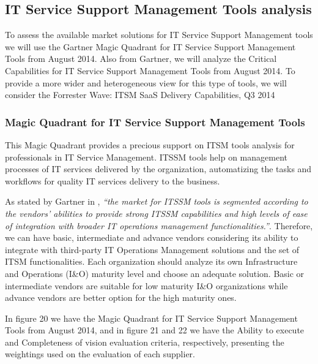 \subsection{IT Service Support Management Tools analysis}

To assess the available market solutions for IT Service Support Management tools we will use the Gartner Magic Quadrant for IT Service Support Management Tools from August 2014\cite{magicQuadrantITSM}. Also from Gartner, we will analyze the Critical Capabilities for IT Service Support Management Tools from August 2014\cite{criticalCapabilitiesITSM}. To provide a more wider and heterogeneous view for this type of tools, we will consider the Forrester Wave: ITSM SaaS Delivery Capabilities, Q3 2014\cite{forresterWaveITSM}\par 

\subsubsection{Magic Quadrant for IT Service Support Management Tools}

This Magic Quadrant provides a precious support on ITSM tools analysis for professionals in IT Service Management. ITSSM tools help on management processes of IT services delivered by the organization, automatizing the tasks and workflows for quality IT services delivery to the business.\par
As stated by Gartner in \cite{magicQuadrantITSM}, \textit{``the market for ITSSM tools is segmented according to the vendors' abilities to provide strong ITSSM capabilities and high levels of ease of integration with broader IT operations management functionalities.''}. Therefore, we can have basic, intermediate and advance vendors considering its ability to integrate with third-party IT Operations Management solutions and the set of ITSM functionalities. Each organization should analyze its own Infrastructure and Operations (I\&O) maturity level and choose an adequate solution. Basic or intermediate vendors are suitable for low maturity I\&O organizations while advance vendors are better option for the high maturity ones.\par
In figure 20 we have the Magic Quadrant for IT Service Support Management Tools from August 2014, and in figure 21 and 22 we have the Ability to execute and Completeness of vision evaluation criteria, respectively, presenting the weightings used on the evaluation of each supplier.\par

